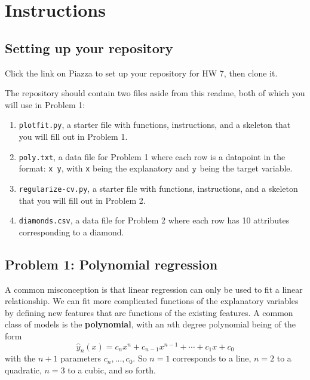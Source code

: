 \documentclass[10pt]{article}
\begin{document}
\section{Instructions}
\renewcommand{\thesubsection}{\thesection.\number\numexpr\value{subsection}-1\relax}

\subsection{Setting up your repository}
Click the link on Piazza to set up your repository for HW 7, then clone it.

The repository should contain two files aside from this readme, both of which you will use in Problem 1:

\begin{enumerate}
\item {\tt plotfit.py}, a starter file with functions, instructions, and a skeleton that you will fill out in Problem 1.
\item {\tt poly.txt}, a data file for Problem 1 where each row is a datapoint in the format: {\tt x y}, with {\tt x} being the explanatory and ${\tt y}$ being the target variable.
\item {\tt regularize-cv.py}, a starter file with functions, instructions, and a skeleton that you will fill out in Problem 2.
\item {\tt diamonds.csv}, a data file for Problem 2 where each row has 10 attributes corresponding to a diamond.
\end{enumerate}



\subsection{Problem 1: Polynomial regression}
A common misconception is that linear regression can only be used to fit a linear relationship. We can fit more complicated functions of the explanatory variables by defining new features that are functions of the existing features. A common class of models is the \textbf{polynomial}, with an $n$th degree polynomial being of the form
$$\hat{y}_n(x) = c_n x^n + c_{n-1} x^{n-1} + \cdots + c_1 x + c_0$$
with the $n+1$ parameters $c_n, ..., c_0$. So $n=1$ corresponds to a line, $n=2$ to a quadratic, $n=3$ to a cubic, and so forth.
\end{document}
